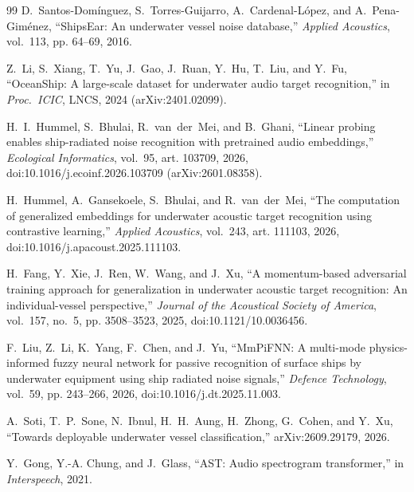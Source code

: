 ﻿\documentclass[journal]{IEEEtran}
\begin{document}
{\begin{thebibliography}{99}
D.~Santos-Dom\'inguez, S.~Torres-Guijarro, A.~Cardenal-L\'opez, and A.~Pena-Gim\'enez,
``ShipsEar: An underwater vessel noise database,'' \emph{Applied Acoustics}, vol.~113,
pp. 64--69, 2016.

Z.~Li, S.~Xiang, T.~Yu, J.~Gao, J.~Ruan, Y.~Hu, T.~Liu, and Y.~Fu, ``OceanShip: A large-scale
dataset for underwater audio target recognition,'' in \emph{Proc.\ ICIC}, LNCS, 2024
(arXiv:2401.02099).

H.~I.~Hummel, S.~Bhulai, R.~van~der~Mei, and B.~Ghani, ``Linear probing enables ship-radiated
noise recognition with pretrained audio embeddings,'' \emph{Ecological Informatics}, vol.~95,
art. 103709, 2026, doi:10.1016/j.ecoinf.2026.103709 (arXiv:2601.08358).

H.~Hummel, A.~Gansekoele, S.~Bhulai, and R.~van~der~Mei, ``The computation of generalized
embeddings for underwater acoustic target recognition using contrastive learning,''
\emph{Applied Acoustics}, vol.~243, art. 111103, 2026, doi:10.1016/j.apacoust.2025.111103.

H.~Fang, Y.~Xie, J.~Ren, W.~Wang, and J.~Xu, ``A momentum-based adversarial training approach
for generalization in underwater acoustic target recognition: An individual-vessel
perspective,'' \emph{Journal of the Acoustical Society of America}, vol.~157, no.~5,
pp. 3508--3523, 2025, doi:10.1121/10.0036456.

F.~Liu, Z.~Li, K.~Yang, F.~Chen, and J.~Yu, ``MmPiFNN: A multi-mode physics-informed fuzzy neural
network for passive recognition of surface ships by underwater equipment using ship radiated noise
signals,'' \emph{Defence Technology}, vol.~59, pp. 243--266, 2026, doi:10.1016/j.dt.2025.11.003.

A.~Soti, T.~P.~Sone, N.~Ibnul, H.~H.~Aung, H.~Zhong, G.~Cohen, and Y.~Xu, ``Towards deployable
underwater vessel classification,'' arXiv:2609.29179, 2026.

Y.~Gong, Y.-A. Chung, and J.~Glass, ``AST: Audio spectrogram transformer,'' in \emph{Interspeech},
2021.
\end{thebibliography}
}
\end{document}
